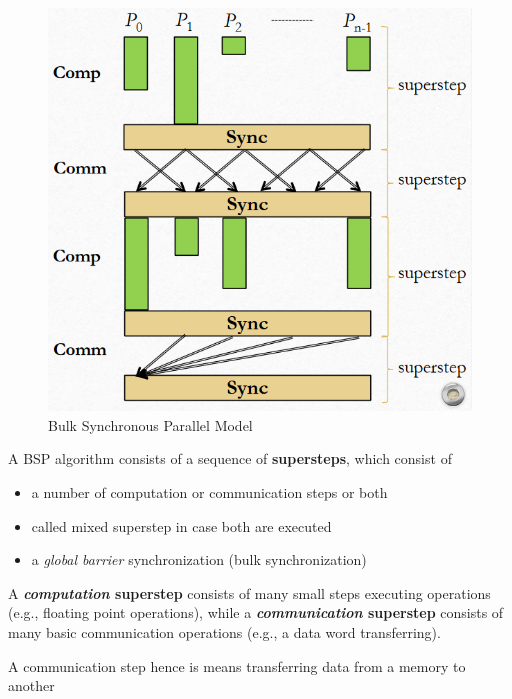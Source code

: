 \newpage
\begin{paracol}{2}
   \begin{figure}[htbp]
      \centering
      \includegraphics{images/07/bsp.png}
      \caption{Bulk Synchronous Parallel Model}
      \label{fig:07/bsp}
   \end{figure}
   
   \switchcolumn
   A BSP algorithm consists of a sequence of \textbf{supersteps}, which consist of
   \begin{itemize}
   	\item a number of computation or communication steps or both
   	\item called mixed superstep in case both are executed
   	\item a\textit{ global barrier} synchronization (bulk synchronization)
   \end{itemize}

   A \textbf{\textit{computation} superstep} consists of many small steps executing operations (e.g., floating point operations), while a \textbf{\textit{communication} superstep} consists of many basic communication operations (e.g., a data word transferring).

   A communication step hence is means transferring data from a memory to another

\end{paracol}

